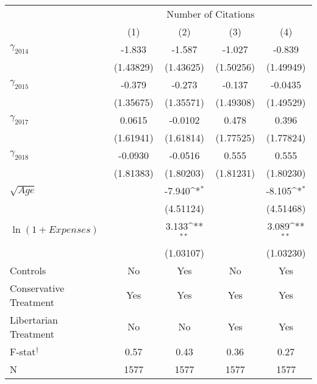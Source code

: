 \def\sym#1{\ifmmode^{#1}\else\(^{#1}\)\fi}
\setlength\tabcolsep{15pt}
\begin{tabular}{@{\extracolsep{7pt}}lcccc}
\toprule
                    &\multicolumn{4}{c}{Number of Citations}                                                \\\cmidrule(lr){2-5}
                    &\multicolumn{1}{c}{(1)}         &\multicolumn{1}{c}{(2)}         &\multicolumn{1}{c}{(3)}         &\multicolumn{1}{c}{(4)}         \\
\midrule
\large $\gamma_{2014}$&      -1.833         &      -1.587         &      -1.027         &      -0.839         \\
                    &   (1.43829)         &   (1.43625)         &   (1.50256)         &   (1.49949)         \\
\addlinespace
\large $\gamma_{2015}$&      -0.379         &      -0.273         &      -0.137         &     -0.0435         \\
                    &   (1.35675)         &   (1.35571)         &   (1.49308)         &   (1.49529)         \\
\addlinespace
\large $\gamma_{2017}$&      0.0615         &     -0.0102         &       0.478         &       0.396         \\
                    &   (1.61941)         &   (1.61814)         &   (1.77525)         &   (1.77824)         \\
\addlinespace
\large $\gamma_{2018}$&     -0.0930         &     -0.0516         &       0.555         &       0.555         \\
                    &   (1.81383)         &   (1.80203)         &   (1.81231)         &   (1.80230)         \\
\addlinespace
$\sqrt{Age}$        &                     &      -7.940\sym{*}        &                     &      -8.105\sym{*}         \\
                    &                     &   (4.51124)         &                     &   (4.51468)         \\
\addlinespace
\small $\ln(1+Expenses)$&                     &       3.133\sym{**} &                     &       3.089\sym{**} \\
                    &                     &   (1.03107)         &                     &   (1.03230)         \\
\midrule
Controls            &          No         &         Yes         &          No         &         Yes         \\
Conservative Treatment&         Yes         &         Yes         &         Yes         &         Yes         \\
Libertarian Treatment&          No         &          No         &         Yes         &         Yes         \\
F-stat$^\dag$              &       0.57         &       0.43         &       0.36         &       0.27         \\
N                   &        1577         &        1577         &        1577         &        1577         \\
\bottomrule
\end{tabular}
